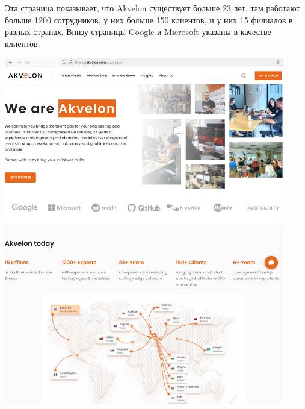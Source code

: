 
Эта страница показывает, что Akvelon существует больше 23 лет,
там работают больше 1200 сотрудников, у них больше 150 клиентов,
и у них 15 филиалов в разных странах.
Внизу страницы Google и Microsoft указаны в качестве клиентов.

\begin{center}
    \includegraphics[width=33em]{akvelon-about-p1}
\end{center}
\WillContinue
\pagebreak

